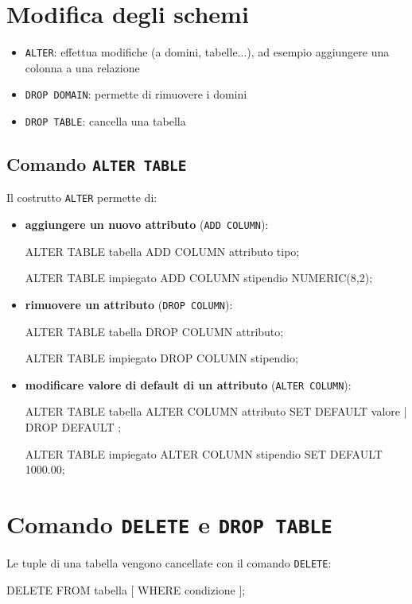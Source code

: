 \section{Modifica degli schemi}
\begin{itemize}[label=$\triangleright$, itemsep=\smallskipamount]
  \item \texttt{ALTER}: effettua modifiche (a domini, tabelle...), ad esempio aggiungere una colonna a una relazione
  \item \texttt{DROP DOMAIN}: permette di rimuovere i domini
  \item \texttt{DROP TABLE}: cancella una tabella
\end{itemize}

\subsection{Comando \texttt{ALTER TABLE}}
Il costrutto \texttt{ALTER} permette di:
\begin{itemize}[label=$\circ$, itemsep=\medskipamount]
  \item \textbf{aggiungere un nuovo attributo} (\texttt{ADD COLUMN}):
\begin{codiceSQL}
ALTER TABLE tabella
ADD COLUMN attributo tipo;

ALTER TABLE impiegato
ADD COLUMN stipendio NUMERIC(8,2);
\end{codiceSQL}
  \item \textbf{rimuovere un attributo} (\texttt{DROP COLUMN}):
\begin{codiceSQL}
ALTER TABLE tabella
DROP COLUMN attributo;

ALTER TABLE impiegato
DROP COLUMN stipendio;
\end{codiceSQL}
  \item \textbf{modificare valore di default di un attributo} (\texttt{ALTER COLUMN}):
\begin{codiceSQL}
ALTER TABLE tabella 
ALTER COLUMN attributo { SET DEFAULT valore | DROP DEFAULT };

ALTER TABLE impiegato 
ALTER COLUMN stipendio SET DEFAULT 1000.00;
\end{codiceSQL}
\end{itemize}

\section{Comando \texttt{DELETE} e \texttt{DROP TABLE}}
Le tuple di una tabella vengono cancellate con il comando \texttt{DELETE}:
\begin{codiceSQL}
DELETE FROM tabella [ WHERE condizione ];
\end{codiceSQL}

